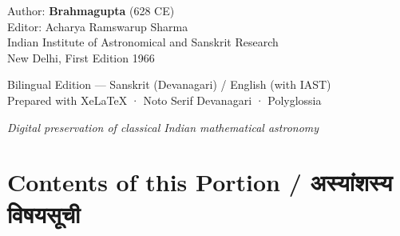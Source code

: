 \documentclass[11pt,a4paper]{article}
\newcommand{\dev}[1]{{\devanagarifont #1}}
\begin{document}
\begin{center}
\vspace{1cm}

{\large Author: \textbf{Brahmagupta} (628 CE)}\\[0.3cm]
{\normalsize Editor: Acharya Ramswarup Sharma}\\[0.1cm]
{\small Indian Institute of Astronomical and Sanskrit Research}\\[0.1cm]
{\small New Delhi, First Edition 1966}

\vspace{1.5cm}

{\small Bilingual Edition — Sanskrit (Devanagari) / English (with IAST)}\\[0.2cm]
{\footnotesize Prepared with XeLaTeX · Noto Serif Devanagari · Polyglossia}

\vfill
{\textit{Digital preservation of classical Indian mathematical astronomy}}

\end{center}
\newpage

\section*{Contents of this Portion / \dev{अस्यांशस्य विषयसूची}}
\end{document}
